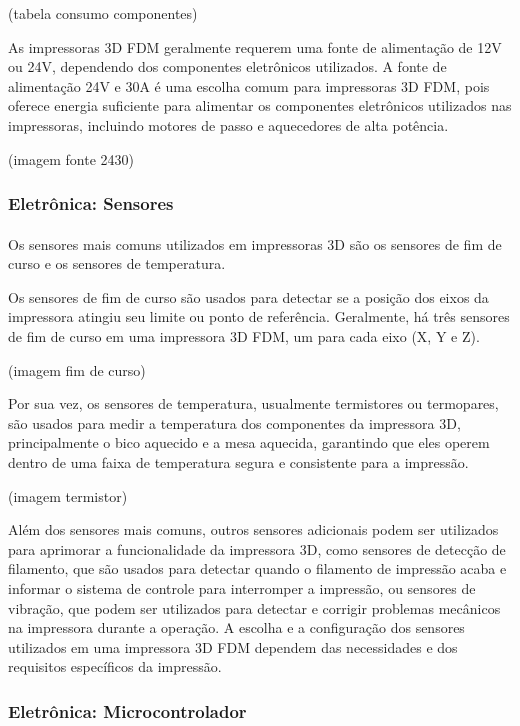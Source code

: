\documentclass[12pt, english]{article}
\begin{document}
(tabela consumo componentes)


As impressoras 3D FDM geralmente requerem uma fonte de alimentação de 12V ou 24V, dependendo dos componentes eletrônicos utilizados. A fonte de alimentação 24V e 30A é uma escolha comum para impressoras 3D FDM, pois oferece energia suficiente para alimentar os componentes eletrônicos utilizados nas impressoras, incluindo motores de passo e aquecedores de alta potência. 

(imagem fonte 2430)

\subsubsection{Eletrônica: Sensores}

\paragraph{}
Os sensores mais comuns utilizados em impressoras 3D são os sensores de fim de curso e os sensores de temperatura. 

Os sensores de fim de curso são usados para detectar se a posição dos eixos da impressora atingiu seu limite ou ponto de referência. Geralmente, há três sensores de fim de curso em uma impressora 3D FDM, um para cada eixo (X, Y e Z). 

(imagem fim de curso)

Por sua vez, os sensores de temperatura, usualmente termistores ou termopares, são usados para medir a temperatura dos componentes da impressora 3D, principalmente o bico aquecido e a mesa aquecida, garantindo que eles operem dentro de uma faixa de temperatura segura e consistente para a impressão.

(imagem termistor)

Além dos sensores mais comuns, outros sensores adicionais podem ser utilizados para aprimorar a funcionalidade da impressora 3D, como sensores de detecção de filamento, que são usados para detectar quando o filamento de impressão acaba e informar o sistema de controle para interromper a impressão, ou sensores de vibração, que podem ser utilizados para detectar e corrigir problemas mecânicos na impressora durante a operação. A escolha e a configuração dos sensores utilizados em uma impressora 3D FDM dependem das necessidades e dos requisitos específicos da impressão.

\subsubsection{Eletrônica: Microcontrolador}
\end{document}
